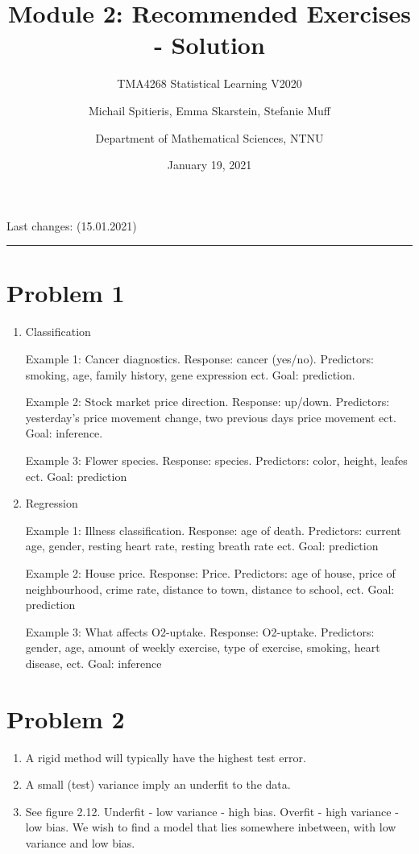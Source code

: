 \documentclass[]{article}
\title{Module 2: Recommended Exercises - Solution}
\subtitle{TMA4268 Statistical Learning V2020}
\author{Michail Spitieris, Emma Skarstein, Stefanie Muff \and Department of Mathematical Sciences, NTNU}
\date{January 19, 2021}
\providecommand{\tightlist}{%
  \setlength{\itemsep}{0pt}\setlength{\parskip}{0pt}}
\begin{document}
\maketitle

Last changes: (15.01.2021)

\begin{center}\rule{0.5\linewidth}{0.5pt}\end{center}

\hypertarget{problem-1}{%
\section{Problem 1}\label{problem-1}}

\begin{enumerate}
\def\labelenumi{\alph{enumi})}
\item
  Classification

  Example 1: Cancer diagnostics. Response: cancer (yes/no). Predictors:
  smoking, age, family history, gene expression ect. Goal: prediction.

  Example 2: Stock market price direction. Response: up/down.
  Predictors: yesterday's price movement change, two previous days price
  movement ect. Goal: inference.

  Example 3: Flower species. Response: species. Predictors: color,
  height, leafes ect. Goal: prediction
\item
  Regression

  Example 1: Illness classification. Response: age of death. Predictors:
  current age, gender, resting heart rate, resting breath rate ect.
  Goal: prediction

  Example 2: House price. Response: Price. Predictors: age of house,
  price of neighbourhood, crime rate, distance to town, distance to
  school, ect. Goal: prediction

  Example 3: What affects O2-uptake. Response: O2-uptake. Predictors:
  gender, age, amount of weekly exercise, type of exercise, smoking,
  heart disease, ect. Goal: inference
\end{enumerate}

\hypertarget{problem-2}{%
\section{Problem 2}\label{problem-2}}

\begin{enumerate}
\def\labelenumi{\alph{enumi})}
\tightlist
\item
  A rigid method will typically have the highest test error.
\item
  A small (test) variance imply an underfit to the data.
\item
  See figure 2.12. Underfit - low variance - high bias. Overfit - high
  variance - low bias. We wish to find a model that lies somewhere
  inbetween, with low variance and low bias.
\end{enumerate}
\end{document}
